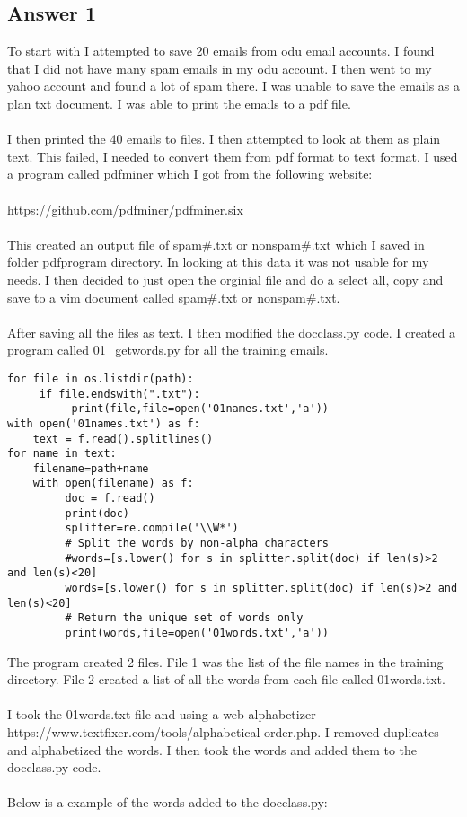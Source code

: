\documentclass[10pt,letterpaper]{article}
\begin{document}
\subsection{Answer 1}
To start with I attempted to save 20 emails from odu email accounts.  I found that I did not have many spam emails in my odu account.  I then went to my yahoo account and found a lot of spam there.  I was unable to save the emails as a plan txt document.  I was able to print the emails to a pdf file.\\
\\
I then printed the 40 emails to files.  I then attempted to look at them as plain text.  This failed, I needed to convert them from pdf format to text format.  I used a program called pdfminer which I got from the following website:\\
\\
https://github.com/pdfminer/pdfminer.six\\
\\
This created an output file of spam\#.txt or nonspam\#.txt which I saved in folder pdfprogram directory. In looking at this data it was not usable for my needs.  I then decided to just open the orginial file and do a select all, copy and save to a vim document called spam\#.txt or nonspam\#.txt.\\
\\
After saving all the files as text.  I then modified the docclass.py code.  I created a program called 01\_getwords.py for all the training emails.\\

\begin{lstlisting}
for file in os.listdir(path):
     if file.endswith(".txt"):
          print(file,file=open('01names.txt','a'))
with open('01names.txt') as f:
    text = f.read().splitlines()
for name in text:
    filename=path+name             
    with open(filename) as f:
         doc = f.read()
         print(doc)
         splitter=re.compile('\\W*')
         # Split the words by non-alpha characters
         #words=[s.lower() for s in splitter.split(doc) if len(s)>2 and len(s)<20]
         words=[s.lower() for s in splitter.split(doc) if len(s)>2 and len(s)<20]
         # Return the unique set of words only
         print(words,file=open('01words.txt','a'))
\end{lstlisting}

The program created 2 files.  File 1 was the list of the file names in the training directory.  File 2 created a list of all the words from each file called 01words.txt.\\
\\
I took the 01words.txt file and using a web alphabetizer https://www.textfixer.com/tools/alphabetical-order.php.  I removed duplicates and alphabetized the words.  I then took the words and added them to the docclass.py code.\\
\\
Below is a example of the words added to the docclass.py:
\end{document}
